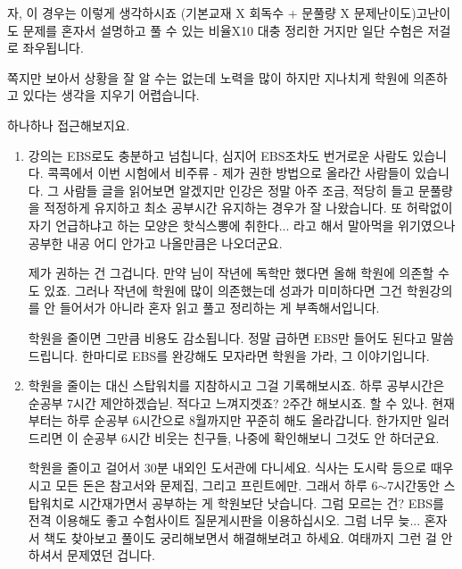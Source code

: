 자, 이 경우는 이렇게 생각하시죠
(기본교재 X 회독수 + 문풀량 X 문제난이도)고난이도 문제를 혼자서 설명하고 풀 수 있는 비율X10
대충 정리한 거지만 일단 수험은 저걸로 좌우됩니다.
\vspace{5mm}

쪽지만 보아서 상황을 잘 알 수는 없는데
노력을 많이 하지만 지나치게 학원에 의존하고 있다는 생각을 지우기 어렵습니다.
\vspace{5mm}

하나하나 접근해보지요.
\vspace{5mm}

\begin{enumerate}
    \item 강의는 EBS로도 충분하고 넘칩니다, 심지어 EBS조차도 번거로운 사람도 있습니다.
    콕콕에서 이번 시험에서 비주류 - 제가 권한 방법으로 올라간 사람들이 있습니다. 그 사람들 글을 읽어보면 알겠지만
    인강은 정말 아주 조금, 적당히 들고 문풀량을 적정하게 유지하고 최소 공부시간 유지하는 경우가 잘 나왔습니다.
    또 허락없이 자기 언급하냐고 하는 모양은 핫식스뽕에 취한다... 라고 해서 말아먹을 위기였으나 공부한 내공 어디 안가고 나올만큼은 나오더군요.
    \vspace{5mm}
    
    제가 권하는 건 그겁니다. 만약 님이 작년에 독학만 했다면 올해 학원에 의존할 수도 있죠.
    그러나 작년에 학원에 많이 의존했는데 성과가 미미하다면 그건 학원강의를 안 들어서가 아니라
    혼자 읽고 풀고 정리하는 게 부족해서입니다.
    \vspace{5mm}
    
    학원을 줄이면 그만큼 비용도 감소됩니다.
    정말 급하면 EBS만 들어도 된다고 말씀드립니다. 한마디로 EBS를 완강해도 모자라면 학원을 가라, 그 이야기입니다.
    \vspace{5mm}
    
    \item 학원을 줄이는 대신 스탑워치를 지참하시고 그걸 기록해보시죠.
    하루 공부시간은 순공부 7시간 제안하겠습닏. 적다고 느껴지겟죠? 2주간 해보시죠. 할 수 있나.
    현재부터는 하루 순공부 6시간으로 8월까지만 꾸준히 해도 올라갑니다.
    한가지만 일러드리면 이 순공부 6시간 비웃는 친구들, 나중에 확인해보니 그것도 안 하더군요.
    \vspace{5mm}
    
    학원을 줄이고 걸어서 30분 내외인 도서관에 다니세요. 식사는 도시락 등으로 때우시고
    모든 돈은 참고서와 문제집, 그리고 프린트에만. 그래서 하루 6$\sim$7시간동안 스탑워치로 시간재가면서 공부하는 게 학원보단 낫습니다.
    그럼 모르는 건? EBS를 전격 이용해도 좋고 수험사이트 질문게시판을 이용하십시오.
    그럼 너무 늦... 혼자서 책도 찾아보고 풀이도 궁리해보면서 해결해보려고 하세요. 여태까지 그런 걸 안 하셔서 문제였던 겁니다.
    \vspace{5mm}
    

\end{enumerate}

